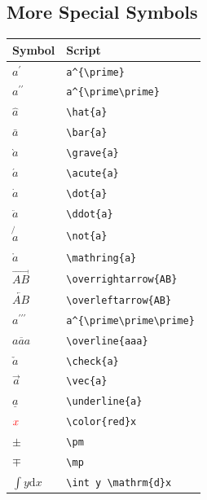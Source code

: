 \documentclass[
]{book}
\begin{document}
\hypertarget{more-special-symbols}{%
\subsection{More Special Symbols}\label{more-special-symbols}}

\begin{longtable}[]{@{}ll@{}}
\toprule\noalign{}
Symbol & Script \\
\midrule\noalign{}
\endhead
\bottomrule\noalign{}
\endlastfoot
\(a^{\prime}\) & \texttt{a\^{}\{\textbackslash{}prime\}} \\
\(a^{\prime\prime}\) & \texttt{a\^{}\{\textbackslash{}prime\textbackslash{}prime\}} \\
\(\hat{a}\) & \texttt{\textbackslash{}hat\{a\}} \\
\(\bar{a}\) & \texttt{\textbackslash{}bar\{a\}} \\
\(\grave{a}\) & \texttt{\textbackslash{}grave\{a\}} \\
\(\acute{a}\) & \texttt{\textbackslash{}acute\{a\}} \\
\(\dot{a}\) & \texttt{\textbackslash{}dot\{a\}} \\
\(\ddot{a}\) & \texttt{\textbackslash{}ddot\{a\}} \\
\(\not{a}\) & \texttt{\textbackslash{}not\{a\}} \\
\(\mathring{a}\) & \texttt{\textbackslash{}mathring\{a\}} \\
\(\overrightarrow{AB}\) & \texttt{\textbackslash{}overrightarrow\{AB\}} \\
\(\overleftarrow{AB}\) & \texttt{\textbackslash{}overleftarrow\{AB\}} \\
\(a^{\prime\prime\prime}\) & \texttt{a\^{}\{\textbackslash{}prime\textbackslash{}prime\textbackslash{}prime\}} \\
\(\overline{aaa}\) & \texttt{\textbackslash{}overline\{aaa\}} \\
\(\check{a}\) & \texttt{\textbackslash{}check\{a\}} \\
\(\vec{a}\) & \texttt{\textbackslash{}vec\{a\}} \\
\(\underline{a}\) & \texttt{\textbackslash{}underline\{a\}} \\
\(\color{red}x\) & \texttt{\textbackslash{}color\{red\}x} \\
\(\pm\) & \texttt{\textbackslash{}pm} \\
\(\mp\) & \texttt{\textbackslash{}mp} \\
\(\int y \mathrm{d}x\) & \texttt{\textbackslash{}int\ y\ \textbackslash{}mathrm\{d\}x} \\

\end{longtable}
\end{document}
